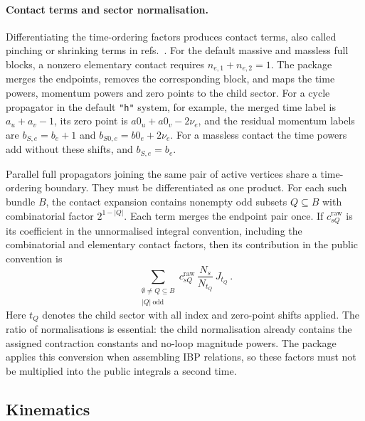 \documentclass[11pt,a4paper]{article}
\begin{document}
\paragraph{Contact terms and sector normalisation.}
Differentiating the time-ordering factors produces contact terms, also called pinching or
shrinking terms in refs.~\cite{Chen:2023iix,Chen:2024glu,Chen:2026dqp}. For the default massive
and massless full blocks, a nonzero elementary contact requires $n_{e,1}+n_{e,2}=1$.
The package merges the endpoints, removes the corresponding block, and maps the time powers,
momentum powers and zero points to the child sector. For a cycle propagator in the default
\texttt{"h"} system, for example, the merged time label is $a_u+a_v-1$, its zero point is
$a0_u+a0_v-2\nu_e$, and the residual momentum labels are $b_{S,e}=b_e+1$ and
$b_{S0,e}=b0_e+2\nu_e$. For a massless contact the time powers add without these shifts, and
$b_{S,e}=b_e$.

Parallel full propagators joining the same pair of active vertices share a time-ordering
boundary. They must be differentiated as one product. For each such bundle $B$, the contact
expansion contains nonempty odd subsets $Q\subseteq B$ with combinatorial factor $2^{1-|Q|}$.
Each term merges the endpoint pair once. If $c^{\mathrm{raw}}_{sQ}$ is its coefficient in the
unnormalised integral convention, including the combinatorial and elementary contact factors,
then its contribution in the public convention is
\begin{equation}
\sum_{\substack{\emptyset\neq Q\subseteq B\\ |Q|\ \mathrm{odd}}}
c^{\mathrm{raw}}_{sQ}\,\frac{N_s}{N_{t_Q}}\,J_{t_Q}\,.
\label{eq:contact}
\end{equation}
Here $t_Q$ denotes the child sector with all index and zero-point shifts applied. The ratio of
normalisations is essential: the child normalisation already contains the assigned contraction
constants and no-loop magnitude powers. The package applies this conversion when assembling
IBP relations, so these factors must not be multiplied into the public integrals a second time.

\subsection{Kinematics}
\label{sec:kinematics}
\end{document}
